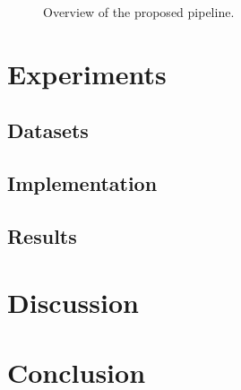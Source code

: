 \documentclass[conference]{IEEEtran}
\begin{document}
\begin{figure}[h]
\centering
\caption{Overview of the proposed pipeline.}
\label{fig:pipeline}
\end{figure}



\section{Experiments}
\label{sec:experiments}

\subsection{Datasets}


\subsection{Implementation}


\subsection{Results}


\section{Discussion}
\label{sec:discussion}



\section{Conclusion}
\label{sec:conclusion}





\end{document}
